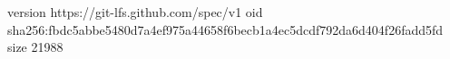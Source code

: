 version https://git-lfs.github.com/spec/v1
oid sha256:fbdc5abbe5480d7a4ef975a44658f6becb1a4ec5dcdf792da6d404f26fadd5fd
size 21988
